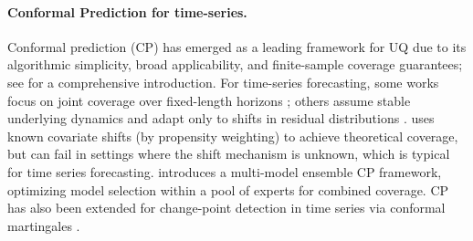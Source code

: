 \paragraph{Conformal Prediction for time-series.} 

Conformal prediction (CP) \citep{vovk2005algorithmic} has emerged as a leading framework for UQ due to its algorithmic simplicity, broad applicability, and finite-sample coverage guarantees; see \cite{angelopoulos2021gentle} for a comprehensive introduction. For time-series forecasting, some works focus on joint coverage over fixed-length horizons \citep{Schaar2021conformaltime, sun2023copula, zhou2024heterogeneous}; others assume stable underlying dynamics and adapt only to shifts in residual distributions \citep{xu2021conformal} . \cite{tibshirani2019conformal} uses known covariate shifts (by propensity weighting) to achieve theoretical coverage, but can fail in settings where the shift mechanism is unknown, which is typical for time series forecasting. \cite{hajihashemi2024multi} introduces a multi-model ensemble CP framework, optimizing model selection within a pool of experts for combined coverage.  CP has also been extended for change-point detection in time series via conformal martingales \citep{vovk2021retrain, volkhonskiy2017inductive}. 


